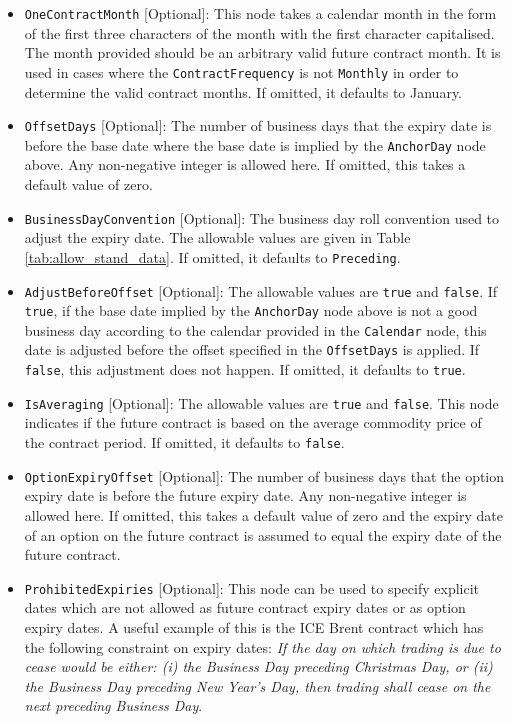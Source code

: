 \begin{itemize}
\item \lstinline!OneContractMonth! [Optional]: This node takes a calendar month in the form of the first three characters of the month with the first character capitalised. The month provided should be an arbitrary valid future contract month. It is used in cases where the \lstinline!ContractFrequency! is not \lstinline!Monthly! in order to determine the valid contract months. If omitted, it defaults to January.
\item \lstinline!OffsetDays! [Optional]: The number of business days that the expiry date is before the base date where the base date is implied by the \lstinline!AnchorDay! node above. Any non-negative integer is allowed here. If omitted, this takes a default value of zero.
\item \lstinline!BusinessDayConvention! [Optional]: The business day roll convention used to adjust the expiry date. The allowable values are given in Table \ref{tab:allow_stand_data}. If omitted, it defaults to \lstinline!Preceding!.
\item \lstinline!AdjustBeforeOffset! [Optional]: The allowable values are \lstinline!true! and \lstinline!false!. If \lstinline!true!, if the base date implied by the \lstinline!AnchorDay! node above is not a good business day according to the calendar provided in the \lstinline!Calendar! node, this date is adjusted before the offset specified in the \lstinline!OffsetDays! is applied. If \lstinline!false!, this adjustment does not happen. If omitted, it defaults to \lstinline!true!. 
\item \lstinline!IsAveraging! [Optional]: The allowable values are \lstinline!true! and \lstinline!false!. This node indicates if the future contract is based on the average commodity price of the contract period. If omitted, it defaults to \lstinline!false!.
\item \lstinline!OptionExpiryOffset! [Optional]: The number of business days that the option expiry date is before the future expiry date. Any non-negative integer is allowed here. If omitted, this takes a default value of zero and the expiry date of an option on the future contract is assumed to equal the expiry date of the future contract.
\item \lstinline!ProhibitedExpiries! [Optional]: This node can be used to specify explicit dates which are not allowed as future contract expiry dates or as option expiry dates. A useful example of this is the ICE Brent contract which has the following constraint on expiry dates: \emph{If the day on which trading is due to cease would be either: (i) the Business Day preceding Christmas Day, or (ii) the Business Day preceding New Year’s Day, then trading shall cease on the next preceding Business Day}.
\end{itemize}

